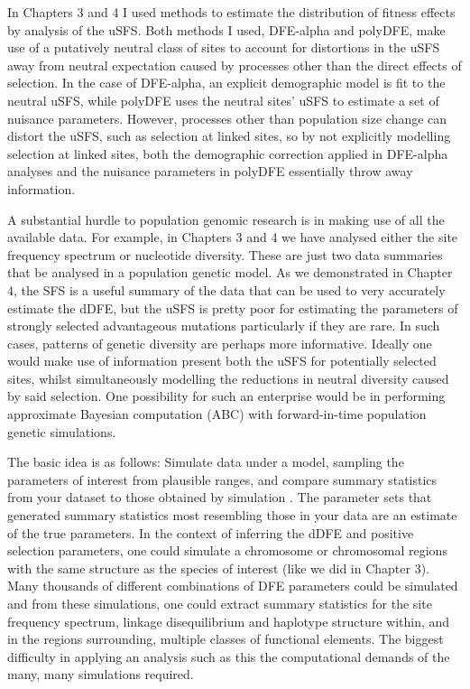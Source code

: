 In Chapters 3 and 4 I used methods to estimate the distribution of fitness effects by analysis of the uSFS. Both methods I used, DFE-alpha and polyDFE, make use of a putatively neutral class of sites to account for distortions in the uSFS away from neutral expectation caused by processes other than the direct effects of selection. In the case of DFE-alpha, an explicit demographic model is fit to the neutral uSFS, while polyDFE uses the neutral sites' uSFS to estimate a set of  nuisance parameters.  However, processes other than population size change can distort the uSFS, such as selection at linked sites, so by not explicitly modelling selection at linked sites, both the demographic correction applied in DFE-alpha analyses and the nuisance parameters in polyDFE essentially throw away information. 

A substantial hurdle to population genomic research is in making use of all the available data. For example, in Chapters 3 and 4 we have analysed either the site frequency spectrum or nucleotide diversity. These are just two data summaries that be analysed in a population genetic model. As we demonstrated in Chapter 4, the SFS is a useful summary of the data that can be used to very accurately estimate the dDFE, but the uSFS is pretty poor for estimating the parameters of strongly selected advantageous mutations particularly if they are rare. In such cases, patterns of genetic diversity are perhaps more informative. Ideally one would make use of information present both the uSFS for potentially selected sites, whilst simultaneously modelling the reductions in neutral diversity caused by said selection. One possibility for such an enterprise would be in performing approximate Bayesian computation (ABC) with forward-in-time population genetic simulations.

The basic idea is as follows: Simulate data under a model, sampling the parameters of interest from  plausible ranges, and compare summary statistics from your dataset to those obtained by simulation \citep{RN356}. The parameter sets that generated summary statistics most resembling those in your data are an estimate of the true parameters. In the context of inferring the dDFE and positive selection parameters, one could simulate a chromosome or chromosomal regions with the same structure as the species of interest (like we did in Chapter 3). Many thousands of different combinations of DFE parameters could be simulated and from these simulations, one could extract summary statistics for the site frequency spectrum, linkage disequilibrium and haplotype structure within, and in the regions surrounding, multiple classes of functional elements. The biggest difficulty in applying an analysis such as this the computational demands of the many, many simulations required.

